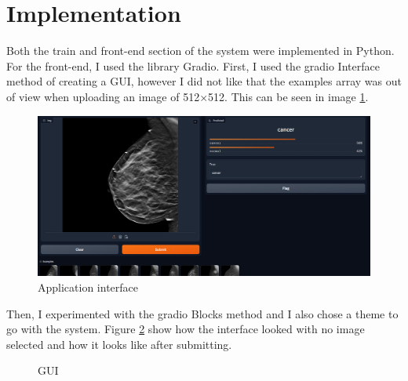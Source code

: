 \section{Implementation}
Both the train and front-end section of the system were implemented in Python. For the front-end, I used the library Gradio. First, I used the gradio Interface method of creating a GUI, however I did not like that the examples array was out of view when uploading an image of 512$\times$512. This can be seen in image \ref{fig:fig15}.

\begin{figure}[H]
    \centering
    \includegraphics[width=0.75\linewidth]{figures/Figure16.png}
    \caption{Application interface}
    \label{fig:fig15}
\end{figure}

Then, I experimented with the gradio Blocks method and I also chose a theme to go with the system. Figure \ref{fig:fig37} show how the interface looked with no image selected and how it looks like after submitting.

\begin{figure}[H]
    \caption{GUI}
    \label{fig:fig37}
\end{figure}

